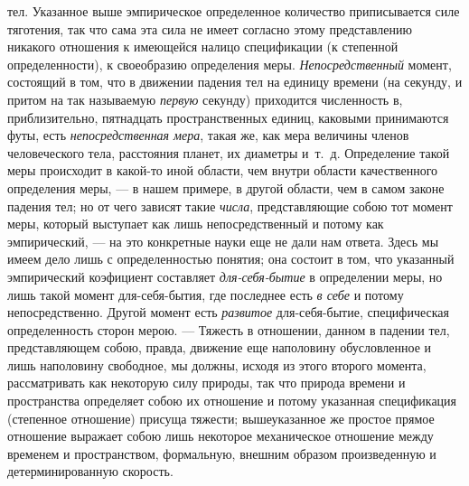 тел. Указанное выше эмпирическое определенное количество приписывается силе
тяготения, так что сама эта сила не имеет согласно этому представлению
никакого отношения к имеющейся налицо спецификации (к степенной
определенности), к своеобразию определения меры.
{\em Непосредственный} момент, состоящий в том, что в
движении падения тел на единицу времени (на секунду, и притом на так
называемую {\em первую} секунду) приходится численность
в, приблизительно, пятнадцать пространственных единиц, каковыми принимаются
футы, есть {\em непосредственная мера}, такая же, как
мера величины членов человеческого тела, расстояния планет, их диаметры
и~т.~д. Определение такой меры происходит в какой-то иной области, чем
внутри области качественного определения меры, — в нашем примере, в другой
области, чем в самом законе падения тел; но от чего зависят такие
{\em числа}, представляющие собою тот момент меры,
который выступает как лишь непосредственный и потому как эмпирический, — на
это конкретные науки еще не дали нам ответа. Здесь мы имеем дело лишь с
определенностью понятия; она состоит в том, что указанный эмпирический
коэфициент составляет {\em для-себя-бытие} в
определении меры, но лишь такой момент для-себя-бытия, где последнее есть
{\em в себе} и потому непосредственно. Другой момент
есть {\em развитое} для-себя-бытие, специфическая
определенность сторон мерою. — Тяжесть в отношении, данном в падении тел,
представляющем собою, правда, движение еще наполовину обусловленное и лишь
наполовину свободное, мы должны, исходя из этого второго момента,
рассматривать как некоторую силу природы, так что природа времени и
пространства определяет собою их отношение и потому указанная спецификация
(степенное отношение) присуща тяжести; вышеуказанное же простое прямое
отношение выражает собою лишь некоторое механическое отношение между
временем и пространством, формальную, внешним образом произведенную и
детерминированную скорость.

